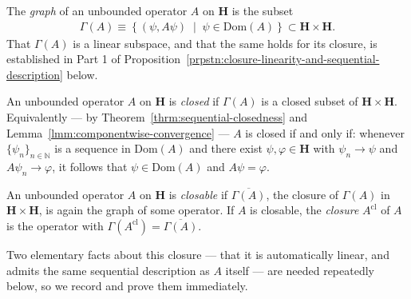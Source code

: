 \begin{definition}
    \label{def:hall-9.6}
    \leanok
    The \textit{graph} of an unbounded operator $A$ on $\mathbf{H}$ is the subset
    \begin{align}
        \Gamma(A) \equiv \left\{ (\psi, A\psi) \;\middle|\; \psi \in \text{Dom}(A) \right\} \subset \mathbf{H} \times \mathbf{H}.
    \end{align}
    That $\Gamma(A)$ is a linear subspace, and that the same holds for its closure, is established in Part 1 of Proposition~\ref{prpstn:closure-linearity-and-sequential-description} below.

    An unbounded operator $A$ on $\mathbf{H}$ is \textit{closed} if $\Gamma(A)$ is a closed subset of $\mathbf{H} \times \mathbf{H}$. Equivalently — by Theorem~\ref{thrm:sequential-closedness} and Lemma~\ref{lmm:componentwise-convergence} — $A$ is closed if and only if: whenever $\{ \psi_n \}_{n \in \mathbb{N}}$ is a sequence in $\text{Dom}(A)$ and there exist $\psi, \varphi \in \mathbf{H}$ with $\psi_n \to \psi$ and $A\psi_n \to \varphi$, it follows that $\psi \in \text{Dom}(A)$ and $A\psi = \varphi$.

    An unbounded operator $A$ on $\mathbf{H}$ is \textit{closable} if $\overline{\Gamma(A)}$, the closure of $\Gamma(A)$ in $\mathbf{H} \times \mathbf{H}$, is again the graph of some operator. If $A$ is closable, the \textit{closure} $A^{\text{cl}}$ of $A$ is the operator with $\Gamma(A^{\text{cl}}) = \overline{\Gamma(A)}$.
\end{definition}

Two elementary facts about this closure — that it is automatically linear, and admits the same sequential description as $A$ itself — are needed repeatedly below, so we record and prove them immediately.

